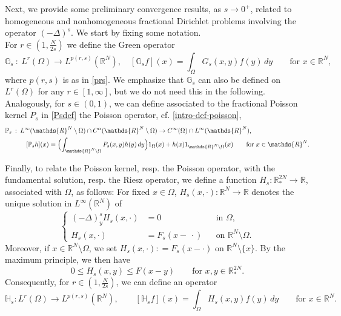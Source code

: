 \documentclass[notitlepage,11pt,reqno]{amsart}
\theoremstyle{definition}
\numberwithin{equation}{section}
\newcommand{\cGs}{{\mathbb G}}
\newcommand{\cHs}{{\mathbb H}}
\newcommand{\cPs}{{{\mathbb P}_s}}
\newcommand{\RR}{\mathds{R}}
\begin{document}
Next, we provide some preliminary convergence results, as $s \to 0^+$, related to homogeneous and nonhomogeneous fractional Dirichlet problems involving the operator $(-\Delta)^s$. We start by fixing some notation.\\

For $r \in (1,\frac{N}{2s})$ we define the Green operator
\begin{equation}
  \label{eq:G-op-definition}
\cGs_s \::\: L^{r}(\Omega) \to L^{p(r,s)}(\RR^N),\quad [\cGs_s f](x) = \int_{\Omega}G_s(x,y)f(y)\,dy \qquad \text{for $x \in \RR^N$,}
\end{equation}
where $p(r,s)$ is as in \eqref{prs}. We emphasize that $\cGs_s$ can also be defined on $L^r(\Omega)$ for any $r\in[1,\infty]$, but we do not need this in the following.
Analogously, for $s \in (0,1)$, we can define associated to the fractional Poisson kernel $P_s$ in \eqref{Psdef} the Poisson operator, cf. \eqref{intro-def-poisson},
\begin{align*}
\cPs \:&:\: L^{\infty}(\RR^N\setminus \Omega)\cap C^\alpha (\RR^N\setminus \Omega) \to C^\infty(\Omega)\cap L^\infty(\RR^N),\\
&\qquad [\cPs h](x) = \Bigl(\int_{\RR^N\setminus \Omega}P_s(x,y)h(y)\,dy\Bigr)  1_{\Omega}(x) + h(x)1_{\RR^N\setminus \Omega}(x) \qquad \text{for $x \in \RR^N$.}
\end{align*}

Finally, to relate the Poisson kernel, resp. the Poisson operator, with the fundamental solution, resp. the Riesz operator, we define a function $H_s: \RR^{2N}_* \to \RR$, associated with $\Omega$, as follows: For fixed $x\in \Omega$, $H_s(x,\cdot): \RR^N \to \RR$ denotes the unique solution in $L^\infty(\RR^N)$ of
\[
\left\{\begin{aligned}
(-\Delta)^s_yH_s(x,\cdot)&=0&&\text{in $\Omega$,}\\
H_s(x,\cdot)&=F_s(x-\,\cdot)&& \text{on $\RR^N\setminus \Omega$.}
\end{aligned}\right.
\]
Moreover, if $x \in \RR^N \setminus \Omega$, we set 
$H_s(x,\cdot): = F_s(x-\cdot)$ on $\RR^N \setminus \{x\}$.
By the maximum principle, we then have 
\begin{equation*}
  \label{eq:H-F-est}
0 \le H_s(x,y) \le F(x-y) \qquad \text{for $x,y \in \RR^{2N}_*$.}  
\end{equation*}
Consequently, for $r \in (1,\frac{N}{2s})$, we can define an operator 
$$
\cHs_s: L^{r}(\Omega) \to L^{p(r,s)}(\RR^N), \qquad [\cHs_s f](x) = \int_{\Omega}H_s(x,y)f(y)\,dy \qquad \text{for $x \in \RR^N$.}
$$
\end{document}
